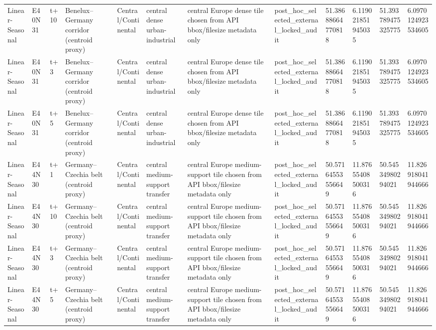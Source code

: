 \begin{landscape}
\begin{longtable}{llllllllllll}
Linear-Seasonal & E40N31 & t+10 & Benelux–Germany corridor (centroid proxy) & Central/Continental & central dense urban-industrial & central Europe dense tile chosen from API bbox/filesize metadata only & post\_hoc\_selected\_external\_locked\_audit & 51.38688664770818 & 6.119021851945035 & 51.393789475325775 & 6.0970124923534605 \\
Linear-Seasonal & E40N31 & t+3 & Benelux–Germany corridor (centroid proxy) & Central/Continental & central dense urban-industrial & central Europe dense tile chosen from API bbox/filesize metadata only & post\_hoc\_selected\_external\_locked\_audit & 51.38688664770818 & 6.119021851945035 & 51.393789475325775 & 6.0970124923534605 \\
Linear-Seasonal & E40N31 & t+5 & Benelux–Germany corridor (centroid proxy) & Central/Continental & central dense urban-industrial & central Europe dense tile chosen from API bbox/filesize metadata only & post\_hoc\_selected\_external\_locked\_audit & 51.38688664770818 & 6.119021851945035 & 51.393789475325775 & 6.0970124923534605 \\
Linear-Seasonal & E44N30 & t+1 & Germany–Czechia belt (centroid proxy) & Central/Continental & central medium-support transfer & central Europe medium-support tile chosen from API bbox/filesize metadata only & post\_hoc\_selected\_external\_locked\_audit & 50.57164553556649 & 11.87655408500316 & 50.54534980294021 & 11.826918041944666 \\
Linear-Seasonal & E44N30 & t+10 & Germany–Czechia belt (centroid proxy) & Central/Continental & central medium-support transfer & central Europe medium-support tile chosen from API bbox/filesize metadata only & post\_hoc\_selected\_external\_locked\_audit & 50.57164553556649 & 11.87655408500316 & 50.54534980294021 & 11.826918041944666 \\
Linear-Seasonal & E44N30 & t+3 & Germany–Czechia belt (centroid proxy) & Central/Continental & central medium-support transfer & central Europe medium-support tile chosen from API bbox/filesize metadata only & post\_hoc\_selected\_external\_locked\_audit & 50.57164553556649 & 11.87655408500316 & 50.54534980294021 & 11.826918041944666 \\
Linear-Seasonal & E44N30 & t+5 & Germany–Czechia belt (centroid proxy) & Central/Continental & central medium-support transfer & central Europe medium-support tile chosen from API bbox/filesize metadata only & post\_hoc\_selected\_external\_locked\_audit & 50.57164553556649 & 11.87655408500316 & 50.54534980294021 & 11.826918041944666 \\

\end{longtable}
\end{landscape}

